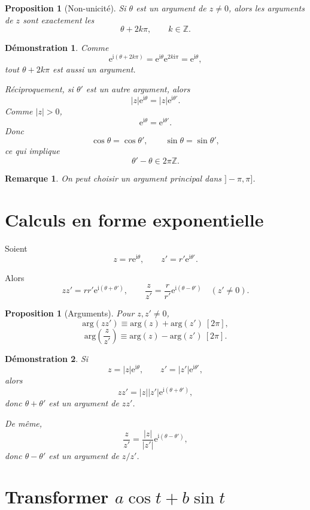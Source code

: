 \documentclass[11pt,a4paper]{article}
\newtheorem{proposition}[definition]{Proposition}
\newtheorem{remarque}[definition]{Remarque}
\newtheorem*{demonstration}{Démonstration}
\newcommand{\ii}{\mathrm{i}}
\newcommand{\e}{\mathrm{e}}
\newcommand{\argp}{\mathrm{arg}}
\begin{document}
\begin{proposition}[Non-unicité]
Si $\theta$ est un argument de $z\neq 0$, alors les arguments de $z$ sont exactement les
\[
\theta+2k\pi,\qquad k\in \mathbb{Z}.
\]
\end{proposition}

\begin{demonstration}
Comme
\[
\e^{\ii(\theta+2k\pi)}=\e^{\ii\theta}\e^{2k\ii\pi}=\e^{\ii\theta},
\]
tout $\theta+2k\pi$ est aussi un argument.

Réciproquement, si $\theta'$ est un autre argument, alors
\[
|z|\e^{\ii\theta}=|z|\e^{\ii\theta'}.
\]
Comme $|z|>0$,
\[
\e^{\ii\theta}=\e^{\ii\theta'}.
\]
Donc
\[
\cos\theta=\cos\theta',
\qquad
\sin\theta=\sin\theta',
\]
ce qui implique
\[
\theta'-\theta\in 2\pi\mathbb{Z}.
\]
\end{demonstration}

\begin{remarque}
On peut choisir un \emph{argument principal} dans $]-\pi,\pi]$.
\end{remarque}

\section{Calculs en forme exponentielle}

Soient
\[
z=r\e^{\ii\theta},
\qquad
z'=r'\e^{\ii\theta'}.
\]

Alors
\[
zz'=rr'\e^{\ii(\theta+\theta')},
\qquad
\frac{z}{z'}=\frac{r}{r'}\e^{\ii(\theta-\theta')}\quad (z'\neq 0).
\]

\begin{proposition}[Arguments]
Pour $z,z'\neq 0$,
\[
\argp(zz')\equiv \argp(z)+\argp(z')\ [2\pi],
\]
\[
\argp\left(\frac{z}{z'}\right)\equiv \argp(z)-\argp(z')\ [2\pi].
\]
\end{proposition}

\begin{demonstration}
Si
\[
z=|z|\e^{\ii\theta},
\qquad
z'=|z'|\e^{\ii\theta'},
\]
alors
\[
zz'=|z||z'|\e^{\ii(\theta+\theta')},
\]
donc $\theta+\theta'$ est un argument de $zz'$.

De même,
\[
\frac{z}{z'}=\frac{|z|}{|z'|}\e^{\ii(\theta-\theta')},
\]
donc $\theta-\theta'$ est un argument de $z/z'$.
\end{demonstration}

\section{Transformer $a\cos t+b\sin t$}
\end{document}
